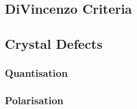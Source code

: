 
\cite{DiVincenzo1995}


\subsection{DiVincenzo Criteria}
\cite{RevModPhys.89.035002}
\cite{Crawford2021}

\subsection{Crystal Defects}

\cite{Kraus2014}

\cite{Kanai2022}

\subsubsection{Quantisation}
\subsubsection{Polarisation}
\cite{PhysRevLett.112.087601}

